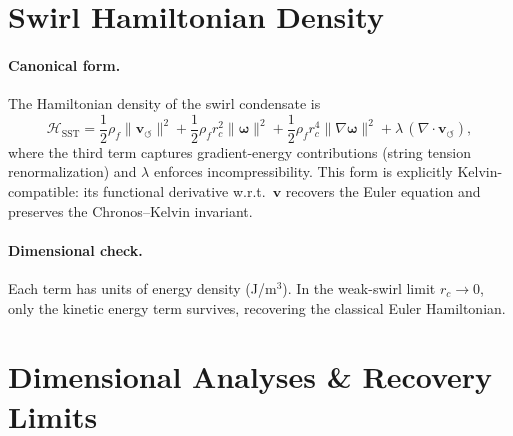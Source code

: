 \documentclass[reprint,aps,onecolumn,nofootinbib]{revtex4-2}
\begin{document}

    \section{Swirl Hamiltonian Density}
    \label{canon58:appA}
    \paragraph{Canonical form.}
        The Hamiltonian density of the swirl condensate is
        \[
            \mathcal{H}_{\mathrm{SST}} =
            \frac{1}{2} \rho_{\!f} \lVert \mathbf{v}_{\!\boldsymbol{\circlearrowleft}}\rVert^2
            + \frac{1}{2} \rho_{\!f} r_c^{2} \lVert \boldsymbol{\omega} \rVert^{2}
            + \frac{1}{2} \rho_{\!f} r_c^{4} \lVert \nabla \boldsymbol{\omega} \rVert^{2}
            + \lambda\,(\nabla \cdot \mathbf{v}_{\!\boldsymbol{\circlearrowleft}}),
        \]
        where the third term captures gradient-energy contributions (string tension renormalization)
        and $\lambda$ enforces incompressibility. This form is explicitly Kelvin-compatible:
        its functional derivative w.r.t.\ $\mathbf{v}$ recovers the Euler equation and preserves
        the Chronos–Kelvin invariant.

    \paragraph{Dimensional check.}
        Each term has units of energy density (J/m$^3$). In the weak-swirl limit $r_c \to 0$,
        only the kinetic energy term survives, recovering the classical Euler Hamiltonian.

    \section{Dimensional Analyses \& Recovery Limits}
    \label{canon58:appB}
\end{document}
